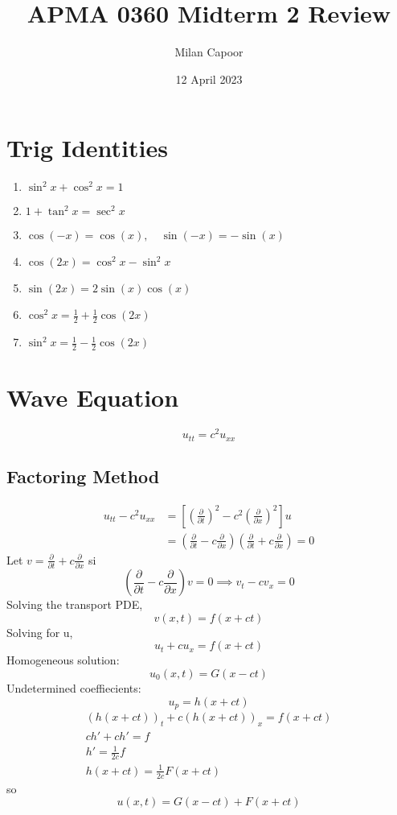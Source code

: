 \documentclass[12pt]{article}
\title{APMA 0360 Midterm 2 Review}
\author{Milan Capoor}
\date{12 April 2023}
\begin{document}
\maketitle
\section{Trig Identities}
\begin{enumerate}
    \item $\sin^2 x + \cos^2 x = 1$
    \item $1 + \tan^2 x = \sec^2 x$
    \item $\cos(-x) = \cos(x), \quad \sin(-x) = -\sin(x)$
    \item $\cos(2x) = \cos^2x - \sin^2 x$
    \item $\sin(2x) = 2\sin(x)\cos(x)$
    \item $\cos^2 x = \frac{1}{2} + \frac{1}{2}\cos(2x)$
    \item $\sin^2 x = \frac{1}{2} - \frac{1}{2}\cos(2x)$
\end{enumerate}

\section{Wave Equation}
\[u_{tt} = c^2 u_{xx}\]
\subsection{Factoring Method}
\begin{align*}
    u_{tt} - c^2 u_{xx} &= \left[\left(\frac{\partial}{\partial t}\right)^2 - c^2 \left(\frac{\partial}{\partial x}\right)^2\right]u\\
    &= \left(\frac{\partial}{\partial t} - c \frac{\partial}{\partial x}\right)\left(\frac{\partial}{\partial t} + c\frac{\partial}{\partial x}\right) = 0
\end{align*}
Let $v = \frac{\partial}{\partial t} + c\frac{\partial}{\partial x}$ si 
\[\left(\frac{\partial}{\partial t} - c\frac{\partial}{\partial x}\right)v = 0 \implies v_t - cv_x = 0\]
Solving the transport PDE,
\[v(x, t) = f(x + ct)\]
Solving for u,
\[u_t + cu_x = f(x + ct)\]
Homogeneous solution:
\[u_0(x, t) = G(x - ct)\]
Undetermined coeffiecients:
\[u_p = h(x + ct)\]
\begin{gather*}
    (h(x +ct))_t + c(h(x + ct))_x = f(x + ct)\\
    ch' + ch' = f\\
    h' = \frac{1}{2c}f\\
    h(x + ct) = \frac{1}{2c}F(x + ct)
\end{gather*}
so 
\[\boxed{u(x, t) = G(x - ct) + F(x + ct)}\]
\end{document}
